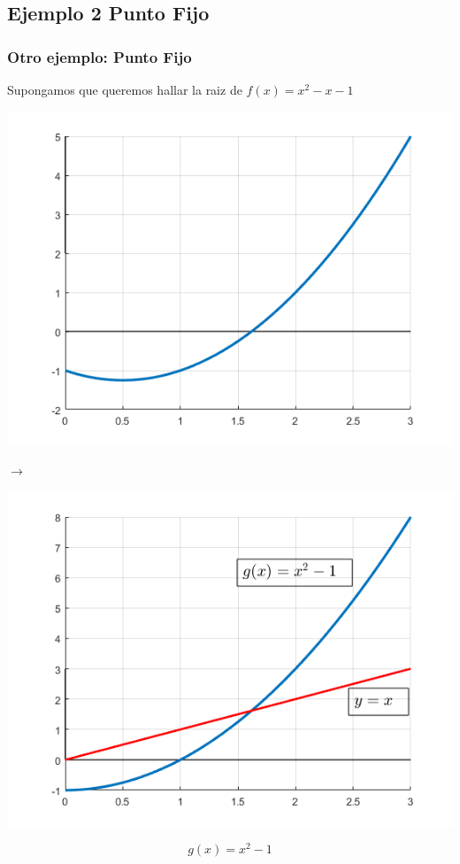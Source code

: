 \documentclass[xcolor=svgnames]{beamer} %
\theoremstyle{plain}
\theoremstyle{definition}
\begin{document}
\subsection{Ejemplo 2 Punto Fijo}


\begin{frame}
\frametitle{Otro ejemplo: Punto Fijo}

Supongamos que queremos hallar la raiz de $f(x) = x^2-x-1$



\begin{minipage}{.45\linewidth}
\includegraphics[width=\linewidth]{fp_example2/f.png} 

\end{minipage} $\rightarrow$  \begin{minipage}{.45\linewidth}
\includegraphics[width=\linewidth]{fp_example2/g.png} 
\end{minipage}

$$g(x) = x^2-1$$
\end{frame}
\end{document}
